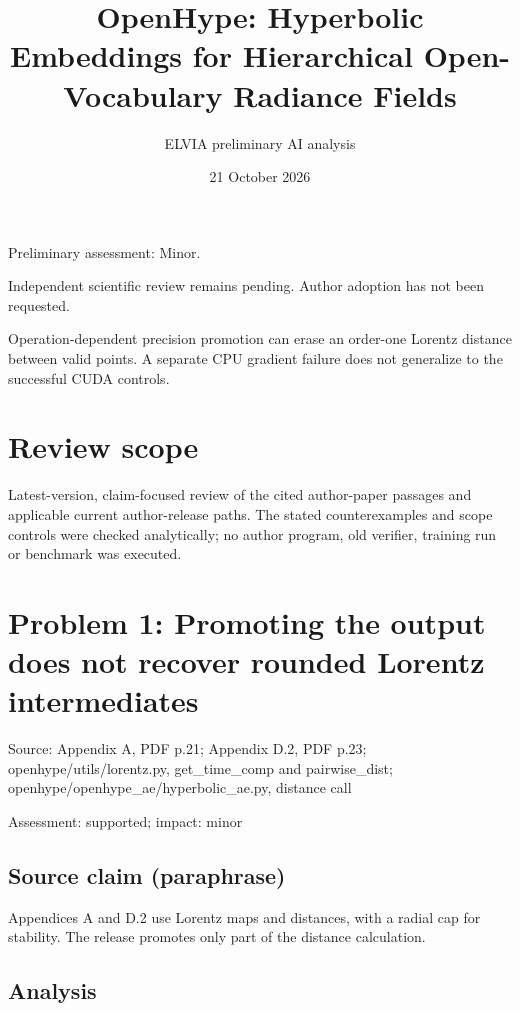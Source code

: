 \documentclass[11pt]{article}
\begin{document}
\title{OpenHype: Hyperbolic Embeddings for Hierarchical Open-Vocabulary Radiance Fields}

\author{ELVIA preliminary AI analysis}\date{21 October 2026}\maketitle

Preliminary assessment: Minor.\par

Independent scientific review remains pending. Author adoption has not been requested.

Operation-dependent precision promotion can erase an order-one Lorentz distance between valid points. A separate CPU gradient failure does not generalize to the successful CUDA controls.

\section*{Review scope}

Latest-version, claim-focused review of the cited author-paper passages and applicable current author-release paths. The stated counterexamples and scope controls were checked analytically; no author program, old verifier, training run or benchmark was executed.

\section*{Problem 1: Promoting the output does not recover rounded Lorentz intermediates}

Source: Appendix A, PDF p.21; Appendix D.2, PDF p.23; openhype/utils/lorentz.py, get\_time\_comp and pairwise\_dist; openhype/openhype\_ae/hyperbolic\_ae.py, distance call

Assessment: supported; impact: minor

\subsection*{Source claim (paraphrase)}

Appendices A and D.2 use Lorentz maps and distances, with a radial cap for stability. The release promotes only part of the distance calculation.

\subsection*{Analysis}
\end{document}
